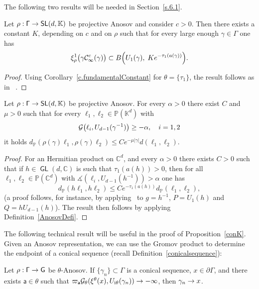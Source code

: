 \documentclass[AHL,Unicode,longabstracts,MathTools]{cedram}
\newcommand{\ii}{\mathrm{i}}
\newcommand{\cartan}{a}
\DeclareMathOperator{\SL}{{\mathsf{SL}}}
\DeclareMathOperator{\GL}{{\mathsf{GL}}}
\renewcommand{\sf}[1]{{\mathsf{#1}}}
\newcommand{\sroot}{{\sf{a}}}
\newcommand{\sfG}{\sf{G}}
\newcommand{\G}{\sf{\Gamma}}
\newcommand{\cal}{\mathcal}
\newcommand{\Gr}{\cal{G}}
\newcommand{\cone}{\cal{C}}
\newcommand{\C}{\mathbb{C}}
\renewcommand{\P}{\mathbb{P}}
\newcommand{\K}{\mathbb{K}}
\newcommand{\g}{\gamma}
\renewcommand{\t}{\theta}
\newcommand{\bord}{\partial}
\newcommand{\peso}{\varpi}
\newcommand{\slroot}{{\tau}}
\renewcommand{\/}{\backslash}
\renewcommand{\angle}{\measuredangle}
\newcommand{\<}{\langle}
\renewcommand{\>}{\rangle}
\renewcommand*{\to}{\mathchoice{\longrightarrow}{\rightarrow}{\rightarrow}{\rightarrow}}
\let\originalleft\left
\let\originalright\right
\renewcommand{\left}{\mathopen{}\mathclose\bgroup\originalleft}
\renewcommand{\right}{\aftergroup\egroup\originalright}
\begin{document}
The following two results will be needed in Section~\ref{s.6.1}.

\begin{prop}%
\label{p.coneinBall}
\label{Lipschitz-compatibleA}
Let $\rho:\G\to\SL(d,\K)$ be projective Anosov and consider $c>0$. Then there exists a constant $K$, depending on $c$ and on $\rho$ such that for every large enough $\g\in\G$ one has
\[
\xi^1_\rho\bigl(\g \cone_\infty^{c}(\g)\bigr)\subset B\left(U_1(\g),\; Ke^{-\slroot_1(\cartan(\g))}\right).
\]
\end{prop}


\begin{proof}
Using Corollary~\ref{c.fundamentalConstant} for $\theta=\{\slroot_1\}$, the result follows as in~ \cite[Section~5.1]{PSW1}.%
\end{proof}



\begin{prop}\label{Lipschitz-compatibleB}
Let $\rho:\G\to\SL(d,\K)$ be projective Anosov. For every $\alpha>0$ there exist $C$ and $\mu>0$ such that for every $\ell_1,\ell_2\in\P(\K^d)$ with
\[
\Gr\left(\ell_i,U_{d-1}(\g^{-1})\right) \geq-\alpha, \quad i=1,2
\]
it holds $d_\P(\rho(\g)\ell_1,\rho(\g)\ell_2)\leq Ce^{-\mu|\g|}d(\ell_1,\ell_2)$.
\end{prop}



\begin{proof}
For an Hermitian product on $\C^d$, and every $\alpha>0$ there exists $C>0$ such that if $h\in\GL(d,\C)$ is such that $\slroot_1(\cartan(h))>0$, then for all $\ell_1,\ell_2\in\P(\C^d)$ with {$\angle(\ell_i,U_{d-1}(h^{-1}))>\alpha$} one has
\[
d_\P(h\ell_1,h\ell_2)\leq Ce^{-\slroot_1(\cartan(h))}d_\P(\ell_1,\ell_2),
\]
(a proof follows, for instance, by applying~\cite[Lemma~2.8]{PSW1} to $g=h^{-1}$, $P=U_1(h)$ and $Q=hU_{d-1}(h)$). The result then follows by applying Definition~\ref{AnosovDefi}.
\end{proof}

The following technical result will be useful in the proof of Proposition~\ref{conK}. Given an Anosov representation, we can use the Gromov product to determine the endpoint of a conical sequence (recall Definition~\ref{conicalsequence}):

\begin{lemm}\label{UdU1}
Let $\rho:\G\to\sfG$ be $\t$-Anosov. If $\{\g_n\}\subset\G$ is a conical sequence, $x\in\bord\G$, and there exists $\sroot\in\t$ such that $\peso_\sroot\Gr_\t(\xi^\t(x),U_{\ii\t}(\g_n))\to-\infty$, then $\g_n\to x$.
\end{lemm}
\end{document}
